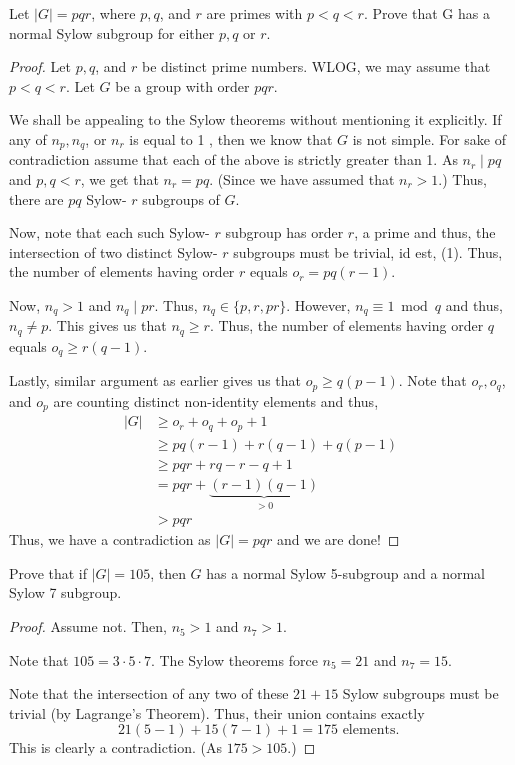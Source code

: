 \begin{exercise}
Let $|G|=p q r$, where $p, q$, and $r$ are primes with $p<q<r$. Prove that G has a normal Sylow subgroup for either $p,q$ or $r$.
\end{exercise}
\begin{proof}
Let $p, q$, and $r$ be distinct prime numbers. WLOG, we may assume that $p<q<r$. Let $G$ be a group with order $p q r$.

We shall be appealing to the Sylow theorems without mentioning it explicitly. If any of $n_p, n_q$, or $n_r$ is equal to 1 , then we know that $G$ is not simple. For sake of contradiction assume that each of the above is strictly greater than 1. As $n_r \mid p q$ and $p, q<r$, we get that $n_r=p q$. (Since we have assumed that $n_r>1$.) Thus, there are $p q$ Sylow- $r$ subgroups of $G$.

Now, note that each such Sylow- $r$ subgroup has order $r$, a prime and thus, the intersection of two distinct Sylow- $r$ subgroups must be trivial, id est, (1). Thus, the number of elements having order $r$ equals $o_r=p q(r-1)$.

Now, $n_q>1$ and $n_q \mid p r$. Thus, $n_q \in\{p, r, p r\}$. However, $n_q \equiv 1 \bmod q$ and thus, $n_q \neq p$. This gives us that $n_q \geq r$. Thus, the number of elements having order $q$ equals $o_q \geq r(q-1)$.

Lastly, similar argument as earlier gives us that $o_p \geq q(p-1)$. Note that $o_r, o_q$, and $o_p$ are counting distinct non-identity elements and thus,
\[
\begin{aligned}
|G|  & \geq o_r+o_q+o_p+1 \\
 &  \geq p q(r-1)+r(q-1)+q(p-1) \\
&  \geq p q r+r q-r-q+1 \\
 & =p q r+\underbrace{(r-1)(q-1)}_{>0} \\
 & >p q r 
\end{aligned}
\]
Thus, we have a contradiction as $|G|=p q r$ and we are done!
\end{proof}

\begin{exercise}
Prove that if $|G|=105$, then $G$ has a normal Sylow 5-subgroup and a normal Sylow 7 subgroup.
\end{exercise}
\begin{proof}
Assume not. Then, $n_5>1$ and $n_7>1$.

Note that $105=3 \cdot 5 \cdot 7$. The Sylow theorems force $n_5=21$ and $n_7=15$.

Note that the intersection of any two of these $21+15$ Sylow subgroups must be trivial (by Lagrange's Theorem). Thus, their union contains exactly
\[
21(5-1)+15(7-1)+1=175 \text { elements. }
\]
This is clearly a contradiction. (As $175>105$.)
\end{proof}

